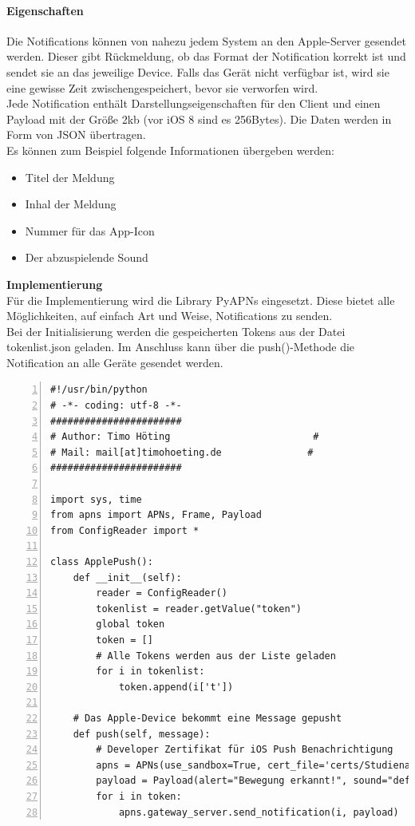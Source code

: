 \paragraph{Eigenschaften}
Die Notifications können von nahezu jedem System an den Apple-Server gesendet werden. Dieser gibt Rückmeldung, ob das Format der Notification korrekt ist und sendet sie an das jeweilige Device. Falls das Gerät nicht verfügbar ist, wird sie eine gewisse Zeit zwischengespeichert, bevor sie verworfen wird. \\
Jede Notification enthält Darstellungseigenschaften für den Client und einen Payload mit der Größe 2kb (vor iOS 8 sind es 256Bytes). Die Daten werden in Form von JSON übertragen.\\
Es können zum Beispiel folgende Informationen übergeben werden: 
\begin{itemize}
	\item Titel der Meldung
	\item Inhal der Meldung
	\item Nummer für das App-Icon
	\item Der abzuspielende Sound
\end{itemize}
\textbf{Implementierung}\\
Für die Implementierung wird die Library PyAPNs\cite{pypans} eingesetzt. Diese bietet alle Möglichkeiten, auf einfach Art und Weise, Notifications zu senden. \\
Bei der Initialisierung werden die gespeicherten Tokens aus der Datei tokenlist.json geladen. Im Anschluss kann über die push()-Methode die Notification an alle Geräte gesendet werden. 
\begin{lstlisting}[caption=Apple Push Notification in Python, language=xml, frame=single, breaklines=true,columns=fullflexible, commentstyle=\color{gray}\upshape, captionpos=b, numbers = left]
#!/usr/bin/python
# -*- coding: utf-8 -*-
#######################
# Author: Timo Höting						  #
# Mail: mail[at]timohoeting.de				 #
#######################

import sys, time
from apns import APNs, Frame, Payload
from ConfigReader import *

class ApplePush():
	def __init__(self):
		reader = ConfigReader()
		tokenlist = reader.getValue("token")
		global token
		token = []
		# Alle Tokens werden aus der Liste geladen
		for i in tokenlist:
			token.append(i['t'])

	# Das Apple-Device bekommt eine Message gepusht
	def push(self, message):
		# Developer Zertifikat für iOS Push Benachrichtigung
		apns = APNs(use_sandbox=True, cert_file='certs/Studienarbeit-APN.crt.pem', key_file='certs/Studienarbeit-APN.key.pem')
		payload = Payload(alert="Bewegung erkannt!", sound="default", badge=1)
		for i in token:
			apns.gateway_server.send_notification(i, payload)
\end{lstlisting}


